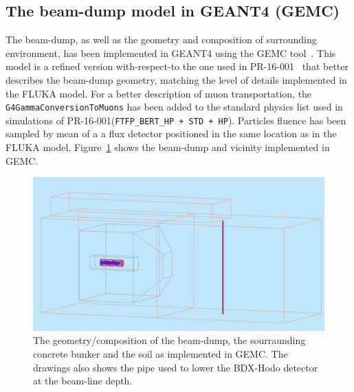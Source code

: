 \subsection{The beam-dump model in GEANT4 (GEMC)}
The beam-dump, as well as the geometry and composition  of surrounding environment,
 has been implemented in GEANT4 using the GEMC tool~\cite{gemc}. This model is a refined version with-respect-to the one used  in PR-16-001~\cite{bdx-proposal} that better describes the beam-dump geometry, matching the level of details  implemented in the FLUKA model. For a better description of  muon transportation, the {\tt G4GammaConversionToMuons} has been added to the standard physics list used in simulations of  PR-16-001({\tt FTFP\_BERT\_HP + STD + HP}).
Particles fluence has been sampled  by mean of a  a flux detector  positioned in the same location as in the FLUKA model.
Figure~\ref{fig:gemc-bd-dwns} shows the beam-dump and vicinity implemented in GEMC.
\begin{figure}[h!] 
\center
\includegraphics[width=12.5cm]{figs/gemc-bd-dwns.pdf}  
\caption{The geometry/composition  of the beam-dump, the sourraunding concrete bunker and  the soil as implemented in GEMC. The drawings also shows the pipe used to lower the BDX-Hodo detector at the  beam-line depth.}
\label{fig:gemc-bd-dwns}
\end{figure}
